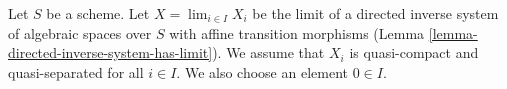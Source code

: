 \begin{situation}
\label{situation-descent}
Let $S$ be a scheme. Let $X = \lim_{i \in I} X_i$ be the limit of a directed
inverse system of algebraic spaces over $S$ with affine transition morphisms
(Lemma \ref{lemma-directed-inverse-system-has-limit}).
We assume that $X_i$ is quasi-compact and quasi-separated for all $i \in I$.
We also choose an element $0 \in I$.
\end{situation}